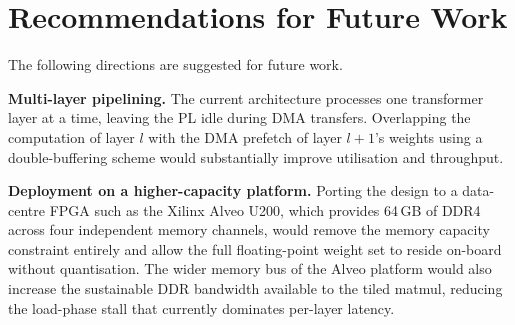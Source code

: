 \section{Recommendations for Future Work}
\label{sec:future_work}

The following directions are suggested for future work.

\textbf{Multi-layer pipelining.} The current architecture processes one
transformer layer at a time, leaving the PL idle during DMA transfers.
Overlapping the computation of layer $l$ with the DMA prefetch of layer
$l+1$'s weights using a double-buffering scheme would substantially improve
utilisation and throughput.

\textbf{Deployment on a higher-capacity platform.} Porting the design to a data-centre FPGA such as the Xilinx Alveo U200, which
provides 64\,GB of DDR4 across four independent memory channels, would remove
the memory capacity constraint entirely and allow the full floating-point weight
set to reside on-board without quantisation. The wider memory bus of the Alveo
platform would also increase the sustainable DDR bandwidth available to the
tiled matmul, reducing the load-phase stall that currently dominates per-layer
latency.
